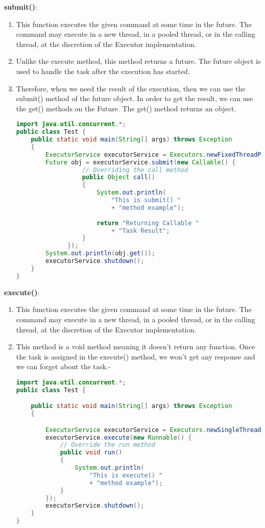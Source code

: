 \documentclass[11pt]{article}
\begin{document}
\begin{enumerate}
	      \textbf{submit()}:
	      \begin{enumerate}
		      \item This function executes the given command at some time in the future. The command may execute in a new thread, in a pooled thread, or in the calling thread, at the discretion of the Executor implementation.
		      \item Unlike the execute method, this method returns a future. The future object is used to handle the task after the execution has started.
		      \item Therefore, when we need the result of the execution, then we can use the submit() method of the future object. In order to get the result, we can use the get() methods on the Future. The get() method returns an object.
		            \begin{lstlisting}[language=Java]
				import java.util.concurrent.*;
public class Test {
    public static void main(String[] args) throws Exception
    {
        ExecutorService executorService = Executors.newFixedThreadPool(1);
        Future obj = executorService.submit(new Callable() {
                  // Overriding the call method
                  public Object call()
                  {
                      System.out.println(
                          "This is submit() "
                          + "method example");
 
                      return "Returning Callable "
                          + "Task Result"; 
                  }
              });
        System.out.println(obj.get());
        executorService.shutdown();
    }
}
			  \end{lstlisting}
	      \end{enumerate}
	      \textbf{execute()}:
	      \begin{enumerate}
		      \item This function executes the given command at some time in the future. The command may execute in a new thread, in a pooled thread, or in the calling thread, at the discretion of the Executor implementation.
		      \item This method is a void method meaning it doesn't return any function. Once the task is assigned in the execute() method, we won't get any response and we can forget about the task.-
		            \begin{lstlisting}[language=Java]				
import java.util.concurrent.*;
public class Test {

	public static void main(String[] args) throws Exception
	{

		ExecutorService executorService = Executors.newSingleThreadExecutor();
		executorService.execute(new Runnable() {
			// Override the run method
			public void run()
			{
				System.out.println(
					"This is execute() "
					+ "method example");
			}
		});				
		executorService.shutdown();
	}
}

			  \end{lstlisting}
	      \end{enumerate}

\end{enumerate}
\end{document}
